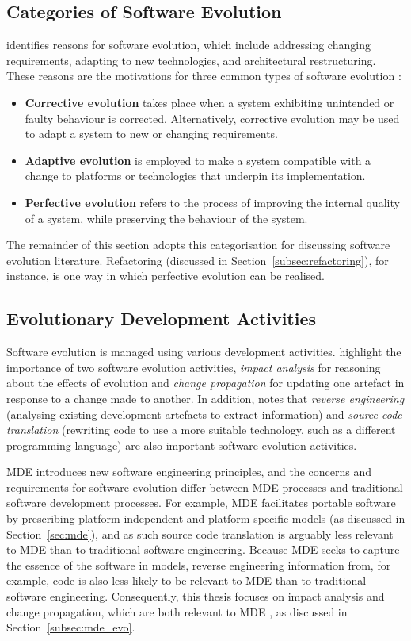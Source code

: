 \subsection{Categories of Software Evolution}
\cite{sjoberg93quantifying} identifies reasons for software evolution, which include addressing changing requirements, adapting to new technologies, and architectural restructuring. These reasons are the motivations for three common types of software evolution \cite[ch. 21]{sommerville06software}:

\begin{itemize}
 \item \textbf{Corrective evolution} takes place when a system exhibiting unintended or faulty behaviour is corrected. Alternatively, corrective evolution may be used to adapt a system to new or changing requirements. 
 \item \textbf{Adaptive evolution} is employed to make a system compatible with a change to platforms or technologies that underpin its implementation.
 \item \textbf{Perfective evolution} refers to the process of improving the internal quality of a system, while preserving the behaviour of the system. 
\end{itemize}

The remainder of this section adopts this categorisation for discussing software evolution literature. Refactoring (discussed in Section~\ref{subsec:refactoring}), for instance, is one way in which perfective evolution can be realised.

\subsection{Evolutionary Development Activities}
Software evolution is managed using various development activities. \cite{winkler09survey} highlight the importance of two software evolution activities, \emph{impact analysis} for reasoning about the effects of evolution and \emph{change propagation} for updating one artefact in response to a change made to another. In addition, \cite{sommerville06software} notes that \emph{reverse engineering} (analysing existing development artefacts to extract information) and \emph{source code translation} (rewriting code to use a more suitable technology, such as a different programming language) are also important software evolution activities.

MDE introduces new software engineering principles, and  the concerns and requirements for software evolution differ between MDE processes and traditional software development processes. For example, MDE facilitates portable software by prescribing platform-independent and platform-specific models (as discussed in Section~\ref{sec:mde}), and as such source code translation is arguably less relevant to MDE than to traditional software engineering. Because MDE seeks to capture the essence of the software in models, reverse engineering information from, for example, code is also less likely to be relevant to MDE than to traditional software engineering. Consequently, this thesis focuses on impact analysis and change propagation, which are both relevant to MDE \cite{winkler09survey}, as discussed in Section~\ref{subsec:mde_evo}.


